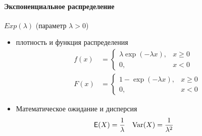 \paragraph{Экспоненциальное распределение} \(Exp(\lambda)\) (параметр \(\lambda>0\))
\begin{itemize}
	\item плотность и функция распределения
	\begin{align*}
		f(x)&=\begin{cases}
			\lambda \exp(-\lambda x), & x\geq0\\
			0, & x<0
		\end{cases} \\
		F(x)&=\begin{cases}
			1-\exp(-\lambda x), & x\geq0 \\
			0, & x<0
		\end{cases}
	\end{align*}
	\item Математическое ожидание и дисперсия
	\begin{align*}
		{\mathsf E}(X)&=\frac{1}{\lambda} & \operatorname{Var}(X)&=\frac{1}{\lambda^2}
	\end{align*}
\end{itemize}